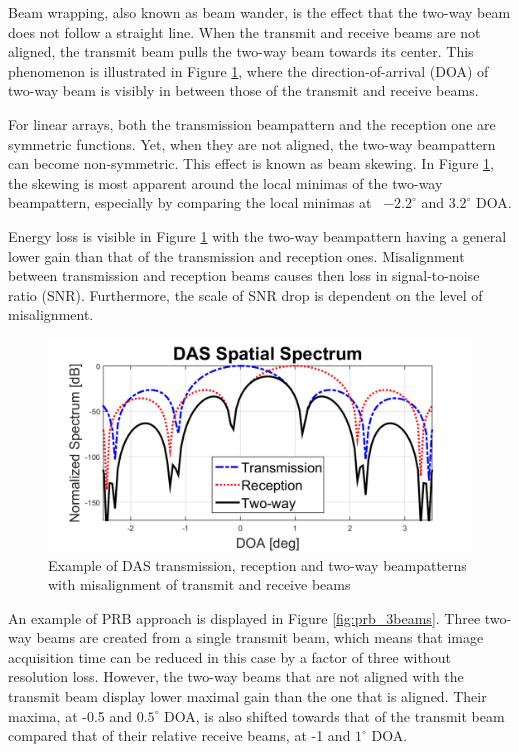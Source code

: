 Beam wrapping, also known as beam wander, is the effect that the two-way beam does not follow a straight line. When the transmit and receive beams are not aligned, the transmit beam pulls the two-way beam towards its center.
This phenomenon is illustrated in Figure \ref{fig:prb}, where the direction-of-arrival (DOA) of two-way beam is visibly in between those of the transmit and receive beams.

For linear arrays, both the transmission beampattern and the reception one are symmetric functions. Yet, when they are not aligned, the two-way beampattern can become non-symmetric. This effect is known as beam skewing. In Figure \ref{fig:prb}, the skewing is most apparent around the local minimas of the two-way beampattern, especially by comparing the local minimas at ~$-2.2^\circ$ and $3.2^\circ$ DOA.

Energy loss is visible in Figure \ref{fig:prb} with the two-way beampattern having a general lower gain than that of the transmission and reception ones.
Misalignment between transmission and reception beams causes then loss in signal-to-noise ratio (SNR). Furthermore, the scale of SNR drop is dependent on the level of misalignment.

\begin{figure}[ht]
    \centering
    \includegraphics[width=\linewidth]{./images/background/prb.png}
	\caption{Example of DAS transmission, reception and two-way beampatterns with misalignment of transmit and receive beams}
	\label{fig:prb}
\end{figure}

An example of PRB approach is displayed in Figure \ref{fig:prb_3beams}. Three two-way beams are created from a single transmit beam, which means that image acquisition time can be reduced in this case by a factor of three without resolution loss. However, the two-way beams that are not aligned with the transmit beam display lower maximal gain than the one that is aligned.
Their maxima, at -0.5 and $0.5^\circ$ DOA, is also shifted towards that of the transmit beam compared that of their relative receive beams, at -1 and $1^\circ$ DOA.


